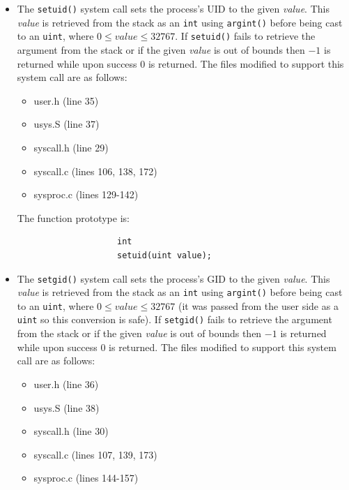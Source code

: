 \documentclass[11pt,letterpaper]{report}
\begin{document}
		\begin{itemize}

			\item The {\tt setuid()} system call sets the process's UID to the given \emph{value}. This \emph{value} is retrieved from the stack
				as an {\tt int} using {\tt argint()} before being cast to an {\tt uint}, where $0 \leq value \leq 32767$. If {\tt setuid()} fails to 
				retrieve the argument from the stack or if the given \emph{value} is out of bounds then $-1$ is returned while
				 upon success $0$ is returned. The files modified to support
				this system call are as follows:
				
					\begin{itemize}
					
					\item user.h (line 35)
					\item usys.S (line 37)
					\item syscall.h (line 29)
					\item syscall.c (lines 106, 138, 172)
					\item sysproc.c (lines 129-142)
					
					\end{itemize}
			
				The function prototype is:
				\begin{verbatim}
					int
					setuid(uint value);
				\end{verbatim}
				
			\item The {\tt setgid()} system call sets the process's GID to the given \emph{value}. This \emph{value} is retrieved from the stack
				as an {\tt int} using {\tt argint()} before being cast to an {\tt uint}, where $0 \leq value \leq 32767$ (it was passed from the user side as a {\tt uint} so this
				conversion is safe). If {\tt setgid()} fails to 
				retrieve the argument from the stack or if the given \emph{value} is out of bounds then $-1$ is returned while upon success $0$ is 				
				returned. The files modified to support
				this system call are as follows:
				
					\begin{itemize}
					
					\item user.h (line 36)
					\item usys.S (line 38)
					\item syscall.h (line 30)
					\item syscall.c (lines 107, 139, 173)  
					\item sysproc.c (lines 144-157)
					

\end{itemize}
\end{itemize}
\end{document}
